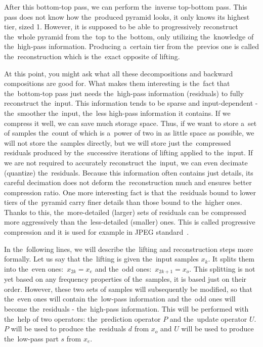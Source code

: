 After this bottom-top pass, we can perform the~inverse top-bottom pass. This pass does not know how the~produced pyramid looks, it only knows its highest tier, sized 1. However, it is supposed to be able to progressively reconstruct the~whole pyramid from the~top to the~bottom, only utilizing the~knowledge of the~high-pass information. Producing a~certain tier from the~previos one is called the~reconstruction which is the~exact opposite of lifting.

At this point, you might ask what all these decompositions and backward compositions are good for. What makes them interesting is the~fact that the~bottom-top pass just needs the~high-pass information (residuals) to fully reconstruct the~input. This information tends to be sparse and input-dependent - the~smoother the~input, the~less high-pass information it contains. If we compress it well, we can save much storage space. Thus, if we want to store a~set of samples the~count of which is a~power of two in as little space as possible, we will not store the~samples directly, but we will store just the~compressed residuals produced by the~successive iterations of lifting applied to the~input. If we are not required to accurately reconstruct the~input, we can even decimate (quantize) the~residuals. Because this information often contains just details, its careful decimation does not deform the~reconstruction much and ensures better compression ratio. One more interesting fact is that the~residuals bound to lower tiers of the~pyramid carry finer details than those bound to the~higher ones. Thanks to this, the~more-detailed (larger) sets of residuals can be compressed more aggressively than the~less-detailed (smaller) ones. This is called progressive compression and it is used for example in JPEG standard~\cite{jpeg}.

In the~following lines, we will describe the~lifting and reconstruction steps more formally.
Let us say that the~lifting is given the~input samples $x_k$. It splits them into the~even ones:~$x_{2k} = x_e$ and the~odd ones:~$x_{2k+1} = x_o$. This splitting is not yet based on any frequency properties of the~samples, it is based just on their order. However, these two sets of samples will subsequently be modified, so that the~even ones will contain the~low-pass information and the~odd ones will become the~residuals - the~high-pass information. This will be performed with the~help of two operators: the~prediction operator $P$ and the~update operator $U$. $P$ will be used to produce the~residuals $d$ from $x_o$ and $U$ will be used to produce the~low-pass part $s$ from $x_e$.

